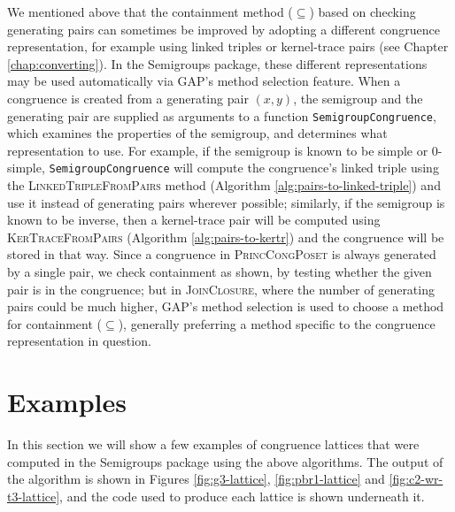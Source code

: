 We mentioned above that the containment method ($\subseteq$) based on checking
generating pairs can sometimes be improved by adopting a different congruence
representation, for example using linked triples or kernel-trace pairs (see
Chapter \ref{chap:converting}).  In the Semigroups package, these different
representations may be used automatically via GAP's method selection feature.
When a congruence is created from a generating pair $(x,y)$, the semigroup and
the generating pair are supplied as arguments to a function
\texttt{SemigroupCongruence}, which examines the properties of the semigroup,
and determines what representation to use.  For example, if the semigroup is
known to be simple or 0-simple, \texttt{SemigroupCongruence} will compute the
congruence's linked triple using the \textsc{LinkedTripleFromPairs} method
(Algorithm \ref{alg:pairs-to-linked-triple}) and use it instead of generating
pairs wherever possible; similarly, if the semigroup is known to be inverse,
then a kernel-trace pair will be computed using \textsc{KerTraceFromPairs}
(Algorithm \ref{alg:pairs-to-kertr}) and the congruence will be stored in that
way.  Since a congruence in \textsc{PrincCongPoset} is always generated by a
single pair, we check containment as shown, by testing whether the given pair is
in the congruence; but in \textsc{JoinClosure}, where the number of generating
pairs could be much higher, GAP's method selection is used to choose a method
for containment ($\subseteq$), generally preferring a method specific to the
congruence representation in question.

\section{Examples}
\label{sec:lattice-examples}

In this section we will show a few examples of congruence lattices that were
computed in the Semigroups package \cite{semigroups} using the above algorithms.
The output of the algorithm is shown in Figures \ref{fig:g3-lattice},
\ref{fig:pbr1-lattice} and \ref{fig:c2-wr-t3-lattice}, and the code used to
produce each lattice is shown underneath it.


